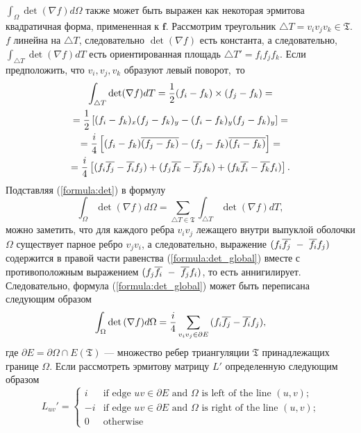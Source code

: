 $\int_{\Omega} \det(\nabla f) d\Omega$ также может быть выражен как некоторая 
эрмитова квадратичная форма, примененная к $\mathbf{f}$. 
Рассмотрим треугольник $\triangle T = v_i v_j v_k \in \mathfrak{T}$. 
$f$ линейна на $\triangle T$, следовательно $\det (\nabla f)$ есть константа, 
а следовательно, $\int_{\triangle T} \det (\nabla f) dT$ есть ориентированная площадь 
$\triangle T' = f_i f_j f_k$. 
Если предположить, что $v_i, v_j, v_k$ образуют левый поворот,~то
\begin{multline}
  \label{formula:det}
  \int_{\triangle T} \det (\nabla f) dT = \frac{1}{2} (f_i - f_k) \times (f_j - f_k) = \\
  = \frac{1}{2} \left[(f_i - f_k)_x (f_j - f_k)_y - (f_i - f_k)_y (f_j - f_k)_y \right] = \\
  = \frac{i}{4} \left[ (f_i - f_k)\overline{(f_j - f_k)} - (f_j - f_k) \overline{(f_i - f_k)} \right] = \\
  = \frac{i}{4} \left[ (f_i \overline{f_j} - \overline{f_i} f_j) + (f_j \overline{f_k} - \overline{f_j} f_k) + 
    (f_k \overline{f_i} - \overline{f_k} f_i) \right].  
\end{multline}
Подставляя (\ref{formula:det}) в формулу
\begin{equation}
  \label{formula:det_global}
  \int_{\Omega} \det {\left( \nabla f \right) } d\Omega = \sum_{\triangle T \in \mathfrak{T}}{ \int_{\triangle T} \det{ \left(\nabla f \right) } dT},
\end{equation}
можно заметить, что для каждого ребра $v_i v_j$ лежащего внутри выпуклой оболочки $\Omega$  
существует парное ребро $v_j v_i$, а следовательно, выражение 
$(f_i \overline{f_j}~-~\overline{f_i} f_j)$ содержится в правой части равенства (\ref{formula:det_global}) 
вместе с противоположным выражением $(f_j \overline{f_i}~-~\overline{f_j} f_i)$, то есть аннигилирует. 
Следовательно, формула (\ref{formula:det_global}) может быть переписана следующим образом
\begin{equation}
\label{formula:det_over_edges}
  \int_{\Omega} \det {\left( \nabla f \right) } d\Omega = \frac{i}{4} \sum_{v_i v_j \in \partial E}{(f_i \overline{f_j} - \overline{f_i} f_j)},
\end{equation}
где $\partial E = \partial \Omega \cap E(\mathfrak{T})$ --- множество ребер 
триангуляции $\mathfrak{T}$ принадлежащих границе $\Omega$. 
Если рассмотреть эрмитову матрицу $L'$ определенную следующим образом
\begin{equation*}
  L_{uv}' = \begin{cases}
    i  & \text{if edge $uv \in \partial E$ and $\Omega$ is left of the line $(u, v)$;} \\ 
    -i & \text{if edge $uv \in \partial E$ and $\Omega$ is right of the line $(u, v)$;} \\ 
    0  & \text{otherwise}
  \end{cases}
\end{equation*}

